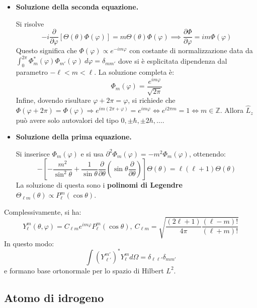 \documentclass[10pt, a4paper]{scrartcl} %
\numberwithin{equation}{subsection}
\theoremstyle{style2}
\theoremstyle{style1}
\begin{document}
\begin{itemize}
	\item \textbf{Soluzione della seconda equazione.} 

		Si risolve 
		\[
		-i \frac{\partial }{\partial \varphi } \left[ \Theta(\theta ) \Phi(\varphi ) \right] = m \Theta(\theta ) \Phi(\varphi ) \implies \frac{\partial \Phi}{\partial \varphi } = im \Phi (\varphi )
		\] 
		Questo significa che $\Phi(\varphi ) \propto e^{-im\varphi } $ con costante di normalizzazione data da $\int_{0} ^{2\pi} \Phi_m^*(\varphi ) \Phi_{m'} (\varphi ) \ d\varphi = \delta _{m m '} $ dove si \`e esplicitata dipendenza dal parametro $-\ell <m <\ell $. La soluzione completa \`e:
		\begin{equation}
			\Phi_m(\varphi ) = \frac{e^{im\varphi } }{\sqrt{2\pi} }
		\end{equation}
		Infine, dovendo risultare $\varphi  +2\pi = \varphi $, si richiede che $\Phi (\varphi + 2\pi ) = \Phi(\varphi ) \Rightarrow e^{im (2\pi + \varphi ) } = e^{im\varphi } \iff e^{i 2\pi m} = 1 \iff m \in \mathbb{Z}$. Allora $\hat{L}_z$ pu\`o avere solo autovalori del tipo $0, \pm\hbar , \pm 2 \hbar , \ldots$.
	\item \textbf{Soluzione della prima equazione.} 

		Si inserisce $\Phi_m(\varphi )$ e si usa $\partial^2 \Phi_m(\varphi ) =-m^2 \Phi_m(\varphi) $, ottenendo:
		\[
		- \left[ - \frac{m^2}{\sin^ 2 \theta } + \frac{1}{\sin\theta } \frac{\partial }{\partial \theta } \left(\sin \theta \frac{\partial }{\partial \theta } \right)  \right] \Theta(\theta ) = \ell (\ell +1) \Theta(\theta )
		\] 
		La soluzione di questa sono i \textbf{polinomi di Legendre} $\Theta_{\ell m} (\theta ) \propto P^m_\ell (\cos \theta ) $.
\end{itemize}
Complessivamente, si ha:
\begin{equation}
	Y^m_\ell (\theta ,\varphi ) = C_{\ell m}  e^{im \varphi } P^m_\ell (\cos \theta ), \ C_{\ell m} = \sqrt{\frac{(2\ell +1)}{4\pi} \frac{(\ell -m)!}{(\ell +m)!}} 
\end{equation}
In questo modo:
\[
\int (Y^{m'} _{\ell '} )^* Y^m_\ell  d \Omega  = \delta _{\ell \ell '} \delta _{m m'} 
\] 
e formano base ortonormale per lo spazio di Hilbert $L^2$.

\subsection{Atomo di idrogeno}
\end{document}
